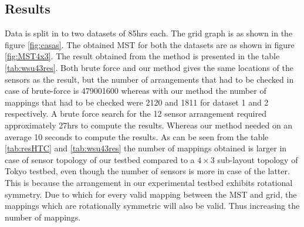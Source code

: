 \subsection{Results}
Data is split in to two datasets of 85hrs each. The grid graph is as shown in the figure \ref{fig:casas}. The obtained MST for both the datasets are as shown in figure \ref{fig:MST4x3}. The result obtained from the method is presented in the table \ref{tab:wsu43res}. Both brute force and our method gives the same locations of the sensors as the result, but the number of arrangements that had to be checked in case of brute-force is 479001600 whereas with our method the number of mappings that had to be checked were 2120 and 1811 for dataset 1 and 2 respectively. A brute force search for the 12 sensor arrangement required approximately 27hrs to compute the results. Whereas our method needed on an average 10 seconds to compute the results. As can be seen from the table \ref{tab:resHTC} and \ref{tab:wsu43res} the number of mappings obtained is larger in case of sensor topology of our testbed compared to a $4 \times 3$ sub-layout topology of Tokyo testbed, even though the number of sensors is more in case of the latter. This is because the arrangement in our experimental testbed exhibits rotational symmetry. Due to which for every valid mapping between the MST and grid, the mappings which are rotationally symmetric will also be valid. Thus increasing the number of mappings.
